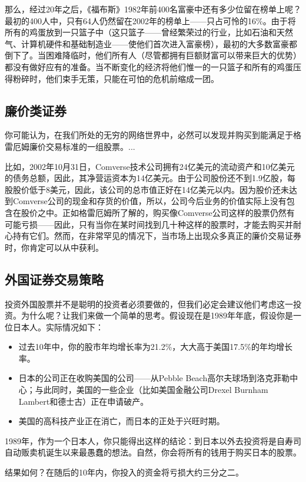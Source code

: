 \documentclass[12pt,oneside]{book}
\begin{document}
那么，经过20年之后，《福布斯》1982年前400名富豪中还有多少位留在榜单上呢？最初的400人中，只有64人仍然留在2002年的榜单上——只占可怜的16\%。由于将所有的鸡蛋放到一只篮子中（这只篮子——曾经繁荣过的行业，比如石油和天然气、计算机硬件和基础制造业——使他们首次进入富豪榜），最初的大多数富豪都倒下了。当困难降临时，他们所有人（尽管都拥有巨额财富可以带来巨大的优势）都没有做好应有的准备。当不断变化的经济将他们惟一的一只篮子和所有的鸡蛋压得粉碎时，他们束手无策，只能在可怕的危机前缩成一团。

\subsection{廉价类证券}
你可能认为，在我们所处的无穷的网络世界中，必然可以发现并购买到能满足于格雷厄姆廉价交易标准的一组股票。...

比如，2002年10月31日，Comverse技术公司拥有24亿美元的流动资产和10亿美元的债务总额，因此，其净营运资本为14亿美元。由于公司股份还不到1.9亿股，每股股价低于8美元，因此，该公司的总市值正好在14亿美元以内。因为股价还未达到Comverse公司的现金和存货的价值，所以，公司今后业务的价值实际上没有包含在股价之中。正如格雷厄姆所了解的，购买像Comverse公司这样的股票仍然有可能亏损——因此，只有当你在某时间找到几十种这样的股票时，才能去购买并耐心持有它们。然而，在非常罕见的情况下，当市场上出现众多真正的廉价交易证券时，你肯定可以从中获利。

\subsection{外国证券交易策略}
投资外国股票并不是聪明的投资者必须要做的，但我们必定会建议他们考虑这一投资。为什么呢？让我们来做一个简单的思考。假设现在是1989年年底，假设你是一位日本人。实际情况如下：

\begin{itemize}
\item 过去10年中，你的股市年均增长率为21.2\%，大大高于美国17.5\%的年均增长率。
\item 日本的公司正在收购美国的公司——从Pebble Beach高尔夫球场到洛克菲勒中心；与此同时，美国的一些企业（比如美国金融公司Drexel Burnham Lambert和德士古）正在申请破产。
\item 美国的高科技产业正在消亡，而日本的正处于兴旺时期。
\end{itemize}

1989年，作为一个日本人，你只能得出这样的结论：到日本以外去投资将是自寿司自动贩卖机诞生以来最愚蠢的想法。自然，你会将所有的钱用于购买日本的股票。

结果如何？在随后的10年内，你投入的资金将亏损大约三分之二。
\end{document}
